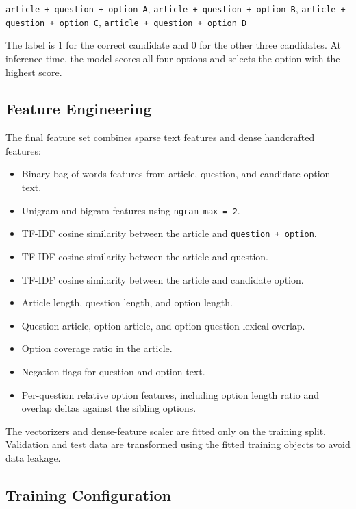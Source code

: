 \documentclass[12pt,a4paper]{article}
\begin{document}
\begin{center}
\texttt{article + question + option A},\quad
\texttt{article + question + option B},\quad
\texttt{article + question + option C},\quad
\texttt{article + question + option D}
\end{center}

The label is 1 for the correct candidate and 0 for the other three candidates.
At inference time, the model scores all four options and selects the option with
the highest score.

\subsection{Feature Engineering}

The final feature set combines sparse text features and dense handcrafted
features:

\begin{itemize}
    \item Binary bag-of-words features from article, question, and candidate
    option text.
    \item Unigram and bigram features using \texttt{ngram\_max = 2}.
    \item TF-IDF cosine similarity between the article and
    \texttt{question + option}.
    \item TF-IDF cosine similarity between the article and question.
    \item TF-IDF cosine similarity between the article and candidate option.
    \item Article length, question length, and option length.
    \item Question-article, option-article, and option-question lexical overlap.
    \item Option coverage ratio in the article.
    \item Negation flags for question and option text.
    \item Per-question relative option features, including option length ratio
    and overlap deltas against the sibling options.
\end{itemize}

The vectorizers and dense-feature scaler are fitted only on the training split.
Validation and test data are transformed using the fitted training objects to
avoid data leakage.

\subsection{Training Configuration}
\end{document}
